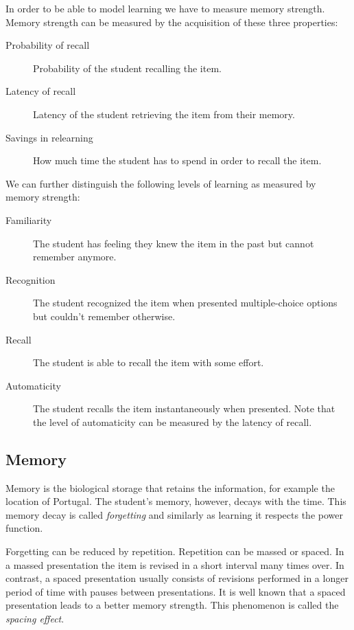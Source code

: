 In order to be able to model learning we have to measure memory strength. Memory strength can be measured by the acquisition of these three properties:

\begin{description}
  \item[Probability of recall] Probability of the student recalling the item.
  \item[Latency of recall] Latency of the student retrieving the item from their memory.
  \item[Savings in relearning] How much time the student has to spend in order to recall the item.
\end{description}

We can further distinguish the following levels of learning as measured by memory strength:

\begin{description}
  \item[Familiarity] The student has feeling they knew the item in the past but cannot remember anymore.
  \item[Recognition] The student recognized the item when presented multiple-choice options but couldn't remember otherwise.
  \item[Recall] The student is able to recall the item with some effort.
  \item[Automaticity] The student recalls the item instantaneously when presented. Note that the level of automaticity can be measured by the latency of recall.
\end{description}

\subsection{Memory}

Memory is the biological storage that retains the information, for example the location of Portugal. The student's memory, however, decays with the time. This memory decay is called \textit{forgetting} and similarly as learning it respects the power function.

Forgetting can be reduced by repetition. Repetition can be massed or spaced. In a massed presentation the item is revised in a short interval many times over. In contrast, a spaced presentation usually consists of revisions performed in a longer period of time with pauses between presentations. It is well known that a spaced presentation leads to a better memory strength. This phenomenon is called the \textit{spacing effect}.

